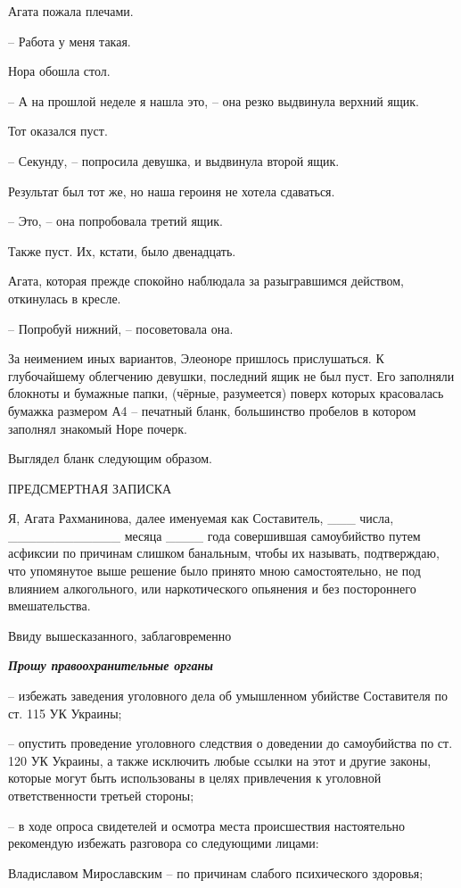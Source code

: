 \documentclass[
  a5paperpaper,
  DIV=11,
  numbers=noendperiod]{scrreprt}
\begin{document}
Агата пожала плечами.

-- Работа у меня такая.

Нора обошла стол.

-- А на прошлой неделе я нашла это, -- она резко выдвинула верхний ящик.

Тот оказался пуст.

-- Секунду, -- попросила девушка, и выдвинула второй ящик.

Результат был тот же, но наша героиня не хотела сдаваться.

-- Это, -- она попробовала третий ящик.

Также пуст. Их, кстати, было двенадцать.

Агата, которая прежде спокойно наблюдала за разыгравшимся действом,
откинулась в кресле.

-- Попробуй нижний, -- посоветовала она.

За неимением иных вариантов, Элеоноре пришлось прислушаться. К
глубочайшему облегчению девушки, последний ящик не был пуст. Его
заполняли блокноты и бумажные папки, (чёрные, разумеется) поверх которых
красовалась бумажка размером А4 -- печатный бланк, большинство пробелов
в котором заполнял знакомый Норе почерк.

Выглядел бланк следующим образом.

ПРЕДСМЕРТНАЯ ЗАПИСКА

Я, Агата Рахманинова, далее именуемая как Составитель, \_\_\_ числа,
\_\_\_\_\_\_\_\_\_\_\_\_ месяца \_\_\_\_ года совершившая самоубийство
путем асфиксии по причинам слишком банальным, чтобы их называть,
подтверждаю, что упомянутое выше решение было принято мною
самостоятельно, не под влиянием алкогольного, или наркотического
опьянения и без постороннего вмешательства.

Ввиду вышесказанного, заблаговременно

\textbf{\emph{Прошу правоохранительные органы}}

-- избежать заведения уголовного дела об умышленном убийстве Составителя
по ст. 115 УК Украины;

-- опустить проведение уголовного следствия о доведении до самоубийства
по ст. 120 УК Украины, а также исключить любые ссылки на этот и другие
законы, которые могут быть использованы в целях привлечения к уголовной
ответственности третьей стороны;

-- в ходе опроса свидетелей и осмотра места происшествия настоятельно
рекомендую избежать разговора со следующими лицами:

Владиславом Мирославским -- по причинам слабого психического здоровья;
\end{document}
